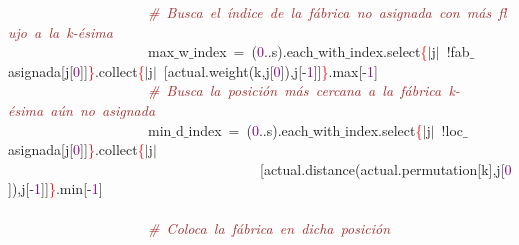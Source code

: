\mbox{}\ \ \ \ \ \ \ \ \ \ \ \ \ \ \ \ \ \ \ \ \textit{\textcolor{Brown}{\#\ Busca\ el\ índice\ de\ la\ fábrica\ no\ asignada\ con\ más\ flujo\ a\ la\ k-ésima}} \\
\mbox{}\ \ \ \ \ \ \ \ \ \ \ \ \ \ \ \ \ \ \ \ max$\_$w$\_$index\ \textcolor{BrickRed}{=}\ \textcolor{BrickRed}{(}\textcolor{Purple}{0}\textcolor{BrickRed}{..}s\textcolor{BrickRed}{).}each$\_$with$\_$index\textcolor{BrickRed}{.}select\textcolor{Red}{\{}\textcolor{BrickRed}{$|$}j\textcolor{BrickRed}{$|$}\ \textcolor{BrickRed}{!}fab$\_$asignada\textcolor{BrickRed}{[}j\textcolor{BrickRed}{[}\textcolor{Purple}{0}\textcolor{BrickRed}{]]}\textcolor{Red}{\}}\textcolor{BrickRed}{.}collect\textcolor{Red}{\{}\textcolor{BrickRed}{$|$}j\textcolor{BrickRed}{$|$}\ \textcolor{BrickRed}{[}actual\textcolor{BrickRed}{.}weight\textcolor{BrickRed}{(}k\textcolor{BrickRed}{,}j\textcolor{BrickRed}{[}\textcolor{Purple}{0}\textcolor{BrickRed}{]),}j\textcolor{BrickRed}{[-}\textcolor{Purple}{1}\textcolor{BrickRed}{]]}\textcolor{Red}{\}}\textcolor{BrickRed}{.}max\textcolor{BrickRed}{[-}\textcolor{Purple}{1}\textcolor{BrickRed}{]} \\
\mbox{}\ \ \ \ \ \ \ \ \ \ \ \ \ \ \ \ \ \ \ \ \textit{\textcolor{Brown}{\#\ Busca\ la\ posición\ más\ cercana\ a\ la\ fábrica\ k-ésima\ aún\ no\ asignada}} \\
\mbox{}\ \ \ \ \ \ \ \ \ \ \ \ \ \ \ \ \ \ \ \ min$\_$d$\_$index\ \textcolor{BrickRed}{=}\ \textcolor{BrickRed}{(}\textcolor{Purple}{0}\textcolor{BrickRed}{..}s\textcolor{BrickRed}{).}each$\_$with$\_$index\textcolor{BrickRed}{.}select\textcolor{Red}{\{}\textcolor{BrickRed}{$|$}j\textcolor{BrickRed}{$|$}\ \textcolor{BrickRed}{!}loc$\_$asignada\textcolor{BrickRed}{[}j\textcolor{BrickRed}{[}\textcolor{Purple}{0}\textcolor{BrickRed}{]]}\textcolor{Red}{\}}\textcolor{BrickRed}{.}collect\textcolor{Red}{\{}\textcolor{BrickRed}{$|$}j\textcolor{BrickRed}{$|$}\ \ \ \ \ \ \ \ \ \ \ \ \ \ \ \ \ \ \ \ \ \ \ \ \ \ \ \ \ \ \ \ \ \ \ \ \textcolor{BrickRed}{[}actual\textcolor{BrickRed}{.}distance\textcolor{BrickRed}{(}actual\textcolor{BrickRed}{.}permutation\textcolor{BrickRed}{[}k\textcolor{BrickRed}{],}j\textcolor{BrickRed}{[}\textcolor{Purple}{0}\textcolor{BrickRed}{]),}j\textcolor{BrickRed}{[-}\textcolor{Purple}{1}\textcolor{BrickRed}{]]}\textcolor{Red}{\}}\textcolor{BrickRed}{.}min\textcolor{BrickRed}{[-}\textcolor{Purple}{1}\textcolor{BrickRed}{]} \\
\mbox{}\  \\
\mbox{}\ \ \ \ \ \ \ \ \ \ \ \ \ \ \ \ \ \ \ \ \textit{\textcolor{Brown}{\#\ Coloca\ la\ fábrica\ en\ dicha\ posición}} \\
